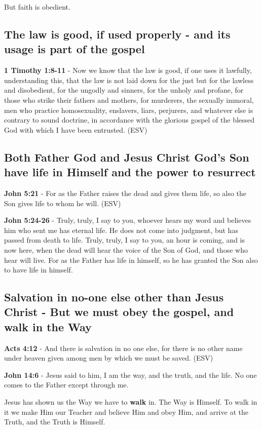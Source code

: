 \documentclass[11pt]{article}
\begin{document}
But faith is obedient.

\subsection{The law is good, if used properly - and its usage is part of the gospel}
\label{sec:org6a0f43f}
\textbf{1 Timothy 1:8-11} - Now we know that the law is good, if one uses it lawfully, understanding this, that the law is not laid down for the just but for the lawless and disobedient, for the ungodly and sinners, for the unholy and profane, for those who strike their fathers and mothers, for murderers, the sexually immoral, men who practice homosexuality, enslavers, liars, perjurers, and whatever else is contrary to sound doctrine, in accordance with the glorious gospel of the blessed God with which I have been entrusted. (ESV)

\subsection{Both Father God and Jesus Christ God's Son have life in Himself and the power to resurrect}
\label{sec:org1d02b9f}
\textbf{John 5:21} - For as the Father raises the dead and gives them life, so also the Son gives life to whom he will. (ESV)

\textbf{John 5:24-26} - Truly, truly, I say to you, whoever hears my word and believes him who sent me has eternal life. He does not come into judgment, but has passed from death to life. Truly, truly, I say to you, an hour is coming, and is now here, when the dead will hear the voice of the Son of God, and those who hear will live. For as the Father has life in himself, so he has granted the Son also to have life in himself.

\subsection{Salvation in no-one else other than Jesus Christ - But we must obey the gospel, and walk in the Way}
\label{sec:org994c6ed}
\textbf{Acts 4:12} - And there is salvation in no one else, for there is no other name under heaven given among men by which we must be saved. (ESV)

\textbf{John 14:6} - Jesus said to him, I am the way, and the truth, and the life. No one comes to the Father except through me.

Jesus has shown us the Way we have to \textbf{walk} in. The Way is Himself. To walk in it we make Him our Teacher and believe Him and obey Him, and arrive at the Truth, and the Truth is Himself.
\end{document}
